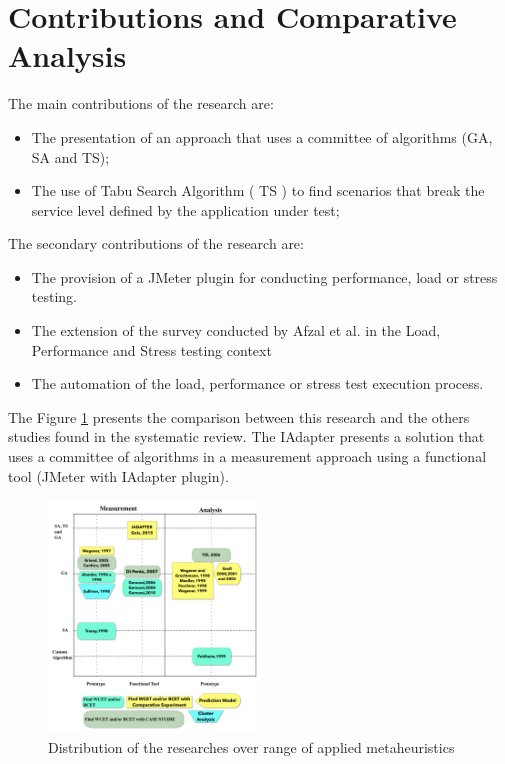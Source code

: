 \section{Contributions and Comparative Analysis}

The main contributions of the research are:

\begin{itemize}
\item The presentation of an approach that uses a committee of algorithms (GA, SA and TS);
\item The use of Tabu Search Algorithm ( TS ) to find scenarios that break the  service level defined by the application under test;
\end{itemize}

The secondary contributions of the research are:

\begin{itemize}
\item The provision of a JMeter plugin for conducting performance, load or stress  testing.
\item The extension of the survey conducted by  Afzal et al. in the Load, Performance and Stress testing context \cite{Afzal2009}
\item The automation of the  load, performance or stress test execution process.
\end{itemize}

The Figure \ref{fig:comparison} presents the comparison between this research and the others studies found in the systematic review. The IAdapter presents a solution that uses a committee of algorithms in a measurement approach using a functional tool (JMeter with IAdapter plugin).

\begin{figure}[h]
\centering
\includegraphics[width=0.5\textwidth]{./images/comparativo.png}
\caption{
Distribution of the researches over range of applied metaheuristics}
\label{fig:comparison}
\end{figure}